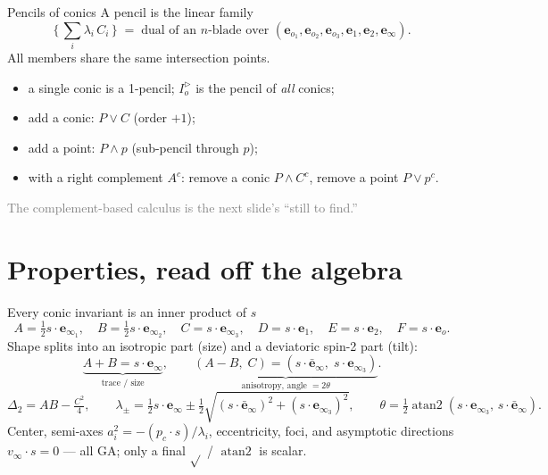 \documentclass[aspectratio=169, 10pt]{beamer}
\newcommand{\eo}{\mathbf{e}_o}
\newcommand{\einff}{\mathbf{e}_\infty}
\newcommand{\einfb}{\bar{\mathbf{e}}_\infty}
\newcommand{\eoi}[1]{\mathbf{e}_{o_{#1}}}
\newcommand{\einfi}[1]{\mathbf{e}_{\infty_{#1}}}
\newcommand{\Iod}{I_o^{\triangleright}}
\newcommand{\wed}{\wedge}
\newcommand{\meet}{\vee}
\newcommand{\dotp}{\cdot}
\newcommand{\vinf}{v_\infty}
\newcommand{\pca}{p_c}
\begin{document}
\begin{frame}[t]{Pencils of conics}
  A \alert{pencil} is the linear family
  \[
    \Big\{\,\textstyle\sum_i \lambda_i\,C_i\,\Big\}
    \;=\; \text{dual of an } n\text{-blade over } (\eoi1,\eoi2,\eoi3,\mathbf{e}_1,\mathbf{e}_2,\einff).
  \]
  All members share the same intersection points.
  \vspace{0.3cm}
  \begin{itemize}\setlength\itemsep{0.3em}
    \item a single conic is a \alert{1-pencil}; $\Iod$ is the pencil of \emph{all} conics;
    \item add a conic: $P\meet C$ \quad(order $+1$);
    \item add a point: $P\wed p$ \quad(sub-pencil through $p$);
    \item with a right \alert{complement} $A^c$: remove a conic $P\wed C^c$, remove a point $P\meet p^c$.
  \end{itemize}
  \vspace{0.2cm}
  \textcolor{gray}{The complement-based calculus is the next slide's ``still to find.''}
\end{frame}

\section{Properties, read off the algebra}

\begin{frame}[t]{Every conic invariant is an inner product of $s$}
  \[
    A=\tfrac12 s\dotp\einfi1,\quad B=\tfrac12 s\dotp\einfi2,\quad C=s\dotp\einfi3,\quad
    D=s\dotp\mathbf{e}_1,\quad E=s\dotp\mathbf{e}_2,\quad F=s\dotp\eo .
  \]
  Shape splits into an \alert{isotropic} part (size) and a \alert{deviatoric spin-2} part (tilt):
  \[
    \underbrace{A+B = s\dotp\einff}_{\text{trace / size}},\qquad
    \underbrace{(A-B,\;C)=(s\dotp\einfb,\;s\dotp\einfi3)}_{\text{anisotropy, angle }=2\theta} .
  \]
  \[
    \Delta_2 = AB-\tfrac{C^2}4,\qquad
    \lambda_\pm=\tfrac12 s\dotp\einff \pm \tfrac12\sqrt{(s\dotp\einfb)^2+(s\dotp\einfi3)^2},\qquad
    \theta=\tfrac12\operatorname{atan2}(s\dotp\einfi3,\,s\dotp\einfb).
  \]
  Center, semi-axes $a_i^2=-(\pca\dotp s)/\lambda_i$, eccentricity, foci, and asymptotic
  directions $\vinf\dotp s=0$ --- \alert{all GA}; only a final $\sqrt{}$ / $\operatorname{atan2}$ is scalar.
\end{frame}
\end{document}
